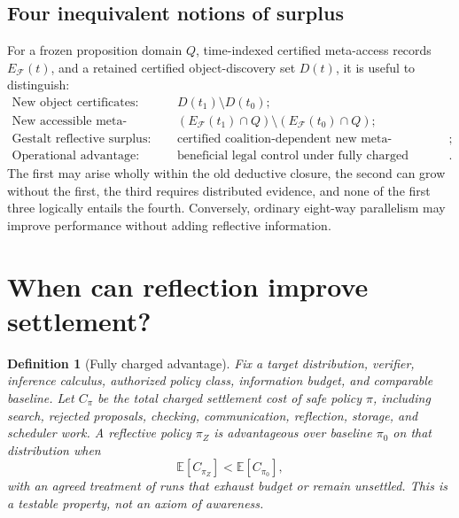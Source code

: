 \documentclass[10pt,letterpaper]{article}
\newtheorem{definition}{Definition}[section]
\theoremstyle{remark}\newtheorem{remark}[definition]{Remark}
\newcommand{\F}{\mathcal{F}}
\begin{document}
\subsection{Four inequivalent notions of surplus}
For a frozen proposition domain $Q$, time-indexed certified meta-access records $E_{\F}(t)$, and a retained certified object-discovery set $D(t)$, it is useful to distinguish:
\begin{align*}
\text{New object certificates:}\quad& D(t_1)\setminus D(t_0);\\
\text{New accessible meta-knowledge:}\quad& (E_{\F}(t_1)\cap Q)\setminus(E_{\F}(t_0)\cap Q);\\
\text{Gestalt reflective surplus:}\quad& \text{certified coalition-dependent new meta-information};\\
\text{Operational advantage:}\quad& \text{beneficial legal control under fully charged comparison}.
\end{align*}
The first may arise wholly within the old deductive closure, the second can grow without the first, the third requires distributed evidence, and none of the first three logically entails the fourth. Conversely, ordinary eight-way parallelism may improve performance without adding reflective information.

\section{When can reflection improve settlement?}
\begin{definition}[Fully charged advantage]
Fix a target distribution, verifier, inference calculus, authorized policy class, information budget, and comparable baseline. Let $C_{\pi}$ be the \emph{total} charged settlement cost of safe policy $\pi$, including search, rejected proposals, checking, communication, reflection, storage, and scheduler work. A reflective policy $\pi_Z$ is advantageous over baseline $\pi_0$ on that distribution when
\[
\mathbb E[C_{\pi_Z}]<\mathbb E[C_{\pi_0}],
\]
with an agreed treatment of runs that exhaust budget or remain unsettled. This is a testable property, not an axiom of awareness.
\end{definition}
\end{document}
